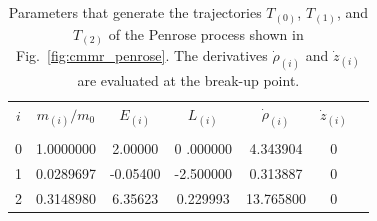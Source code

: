\renewcommand{\arraystretch}{1.2}
\begin{table}[h]
  \centering
  \begin{tabular}{ccccccc}
    \hline\hline
    $i$ & $m_{(i)}/m_0$ & $E_{(i)}$ & $L_{(i)}$         & $\dot{\rho}_{(i)}$ & $\dot{z}_{(i)}$ \\ \vspace{-0.3cm} \\
    0   & 1.0000000     & 2.00000   & 0         .000000 & 4.343904           & 0               \\
    1   & 0.0289697     & -0.05400  & -2.500000         & 0.313887           & 0               \\
    2   & 0.3148980     & 6.35623   & 0.229993          & 13.765800          & 0               \\
    \hline\hline
  \end{tabular}
  \caption{Parameters that generate the trajectories $T_{(0)}$, $T_{(1)}$, and $T_{(2)}$ of the Penrose process shown in Fig.~\ref{fig:cmmr_penrose}. The derivatives $\dot{\rho}_{(i)}$ and $\dot{z}_{(i)}$ are evaluated at the break-up point.}
  \label{tab:cmmr_penrose_example}
\end{table}